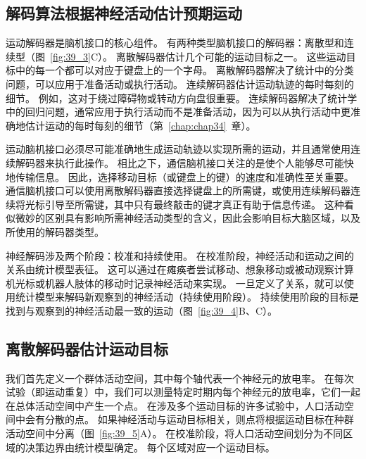 \subsection{解码算法根据神经活动估计预期运动}

运动解码器是脑机接口的核心组件。 
有两种类型脑机接口的解码器：离散型和连续型（图~\ref{fig:39_3}C）。
离散解码器估计几个可能的运动目标之一。
这些运动目标中的每一个都可以对应于键盘上的一个字母。
离散解码器解决了统计中的分类问题，可以应用于准备活动或执行活动。
连续解码器估计运动轨迹的每时每刻的细节。
例如，这对于绕过障碍物或转动方向盘很重要。
连续解码器解决了统计学中的回归问题，通常应用于执行活动而不是准备活动，因为可以从执行活动中更准确地估计运动的每时每刻的细节（第~\ref{chap:chap34}~章）。


运动脑机接口必须尽可能准确地生成运动轨迹以实现所需的运动，并且通常使用连续解码器来执行此操作。
相比之下，通信脑机接口关注的是使个人能够尽可能快地传输信息。
因此，选择移动目标（或键盘上的键）的速度和准确性至关重要。
通信脑机接口可以使用离散解码器直接选择键盘上的所需键，或使用连续解码器连续将光标引导至所需键，其中只有最终敲击的键才真正有助于信息传递。
这种看似微妙的区别具有影响所需神经活动类型的含义，因此会影响目标大脑区域，以及所使用的解码器类型。


神经解码涉及两个阶段：校准和持续使用。
在校准阶段，神经活动和运动之间的关系由统计模型表征。
这可以通过在瘫痪者尝试移动、想象移动或被动观察计算机光标或机器人肢体的移动时记录神经活动来实现。
一旦定义了关系，就可以使用统计模型来解码新观察到的神经活动（持续使用阶段）。
持续使用阶段的目标是找到与观察到的神经活动最一致的运动（图~\ref{fig:39_4}B、C）。



\subsection{离散解码器估计运动目标}

我们首先定义一个群体活动空间，其中每个轴代表一个神经元的放电率。
在每次试验（即运动重复）中，我们可以测量特定时期内每个神经元的放电率，它们一起在总体活动空间中产生一个点。
在涉及多个运动目标的许多试验中，人口活动空间中会有分散的点。
如果神经活动与运动目标相关，则点将根据运动目标在种群活动空间中分离（图~\ref{fig:39_5}A）。
在校准阶段，将人口活动空间划分为不同区域的决策边界由统计模型确定。
每个区域对应一个运动目标。


